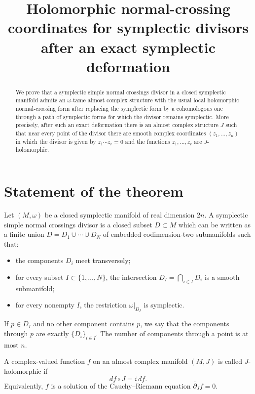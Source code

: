 \documentclass{amsart}
\theoremstyle{definition}
\begin{document}
\title{Holomorphic normal-crossing coordinates for symplectic divisors after an exact symplectic deformation}

\maketitle

\begin{abstract}
We prove that a symplectic simple normal crossings divisor in a closed symplectic manifold
admits an $\omega$-tame almost complex structure with the usual local holomorphic normal-crossing
form after replacing the symplectic form by a cohomologous one through a path of symplectic forms
for which the divisor remains symplectic. More precisely, after such an exact deformation there is
an almost complex structure $J$ such that near every point of the divisor there are smooth complex
coordinates $(z_1,\dots,z_n)$ in which the divisor is given by $z_1\cdots z_r=0$ and the functions
$z_1,\dots,z_r$ are $J$-holomorphic.
\end{abstract}

\section{Statement of the theorem}

Let $(M,\omega)$ be a closed symplectic manifold of real dimension $2n$. A symplectic simple
normal crossings divisor is a closed subset $D\subset M$ which can be written as a finite union
$D=D_1\cup\cdots\cup D_N$ of embedded codimension-two submanifolds such that:

\begin{itemize}
\item the components $D_i$ meet transversely;
\item for every subset $I\subset\{1,\dots,N\}$, the intersection
      $D_I=\bigcap_{i\in I}D_i$ is a smooth submanifold;
\item for every nonempty $I$, the restriction $\omega|_{D_I}$ is symplectic.
\end{itemize}

If $p\in D_I$ and no other component contains $p$, we say that the components through $p$
are exactly $\{D_i\}_{i\in I}$. The number of components through a point is at most $n$.

A complex-valued function $f$ on an almost complex manifold $(M,J)$ is called $J$-holomorphic
if
\[
df\circ J=i\,df .
\]
Equivalently, $f$ is a solution of the Cauchy--Riemann equation
$\bar\partial_J f=0$.
\end{document}
